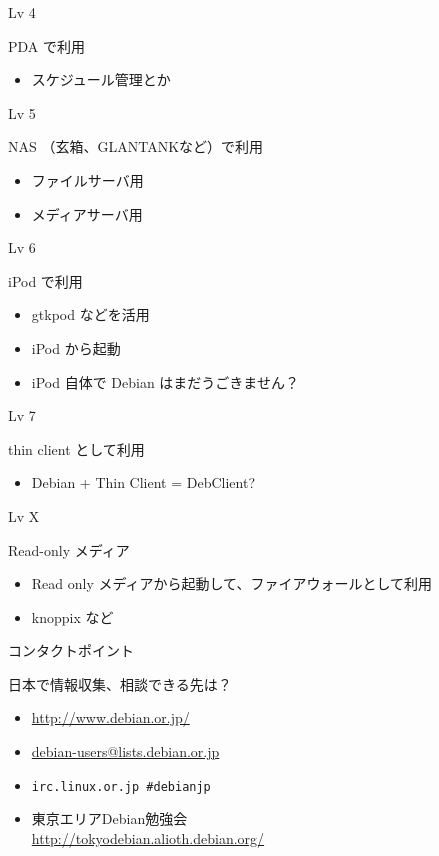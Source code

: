 \documentclass[cjk,dvipdfmx,12pt]{beamer}
\begin{document}
\begin{frame}{Lv 4}

PDA で利用

\begin{itemize}
 \item スケジュール管理とか
\end{itemize}
\end{frame}


\begin{frame}{Lv 5}

NAS （玄箱、GLANTANKなど）で利用

\begin{itemize}
 \item ファイルサーバ用
 \item メディアサーバ用
\end{itemize}
\end{frame}

\begin{frame}{Lv 6}

iPod で利用

\begin{itemize}
 \item gtkpod などを活用
 \item iPod から起動
 \item iPod 自体で Debian はまだうごきません？
\end{itemize}
\end{frame}


\begin{frame}{Lv 7}

thin client として利用

\begin{itemize}
 \item Debian + Thin Client = DebClient?
\end{itemize}
\end{frame}


\begin{frame}{Lv X}

Read-only メディア

\begin{itemize}
 \item Read only メディアから起動して、ファイアウォールとして利用
 \item knoppix など
\end{itemize}
\end{frame}



\begin{frame}{コンタクトポイント}

日本で情報収集、相談できる先は？

\begin{itemize}
 \item \url{http://www.debian.or.jp/}
 \item \url{debian-users@lists.debian.or.jp}
 \item \texttt{irc.linux.or.jp \#debianjp}
 \item 東京エリアDebian勉強会 \\
       \url{http://tokyodebian.alioth.debian.org/}
\end{itemize}
\end{frame}
\end{document}
